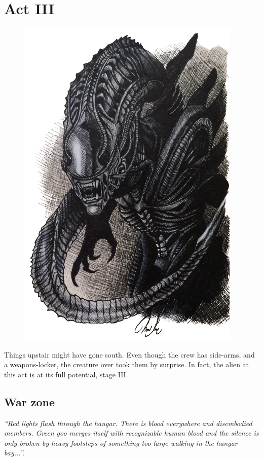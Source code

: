 \chapter{Act III}



\begin{figure}
    \centering
    \includegraphics[width=.45\textwidth]{img/bg/alien.png}
    \label{fig:refinery}
\end{figure}


\begin{rpg-commentbox}{}
    
    Things upstair might have gone south. Even though the crew has side-arms, and a weapons-locker, the creature over took them by surprise. In fact, the alien at this act is at its full potential, stage III. 

\end{rpg-commentbox}    



\section{War zone}



\begin{rpg-commentbox}{}
    
    \textit{
    ``Red lights flash through the hangar. There is blood everywhere and disembodied members. Green goo merges itself with recognizable human blood and the silence is only broken by heavy footsteps of something too large walking in the hangar bay...''.
    } 

    \medskip
\end{rpg-commentbox}    



